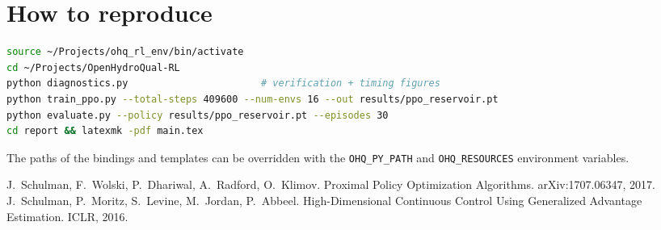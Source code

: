 \documentclass[11pt]{article}
\newcommand{\code}[1]{\texttt{#1}}
\begin{document}
\section{How to reproduce}
\begin{lstlisting}[language=bash]
source ~/Projects/ohq_rl_env/bin/activate
cd ~/Projects/OpenHydroQual-RL
python diagnostics.py                       # verification + timing figures
python train_ppo.py --total-steps 409600 --num-envs 16 --out results/ppo_reservoir.pt
python evaluate.py --policy results/ppo_reservoir.pt --episodes 30
cd report && latexmk -pdf main.tex
\end{lstlisting}
The paths of the bindings and templates can be overridden with the
\code{OHQ\_PY\_PATH} and \code{OHQ\_RESOURCES} environment variables.



\begin{thebibliography}{9}
 J.~Schulman, F.~Wolski, P.~Dhariwal, A.~Radford, O.~Klimov.
  Proximal Policy Optimization Algorithms. arXiv:1707.06347, 2017.
 J.~Schulman, P.~Moritz, S.~Levine, M.~Jordan, P.~Abbeel.
  High-Dimensional Continuous Control Using Generalized Advantage Estimation. ICLR, 2016.
\end{thebibliography}
\end{document}
